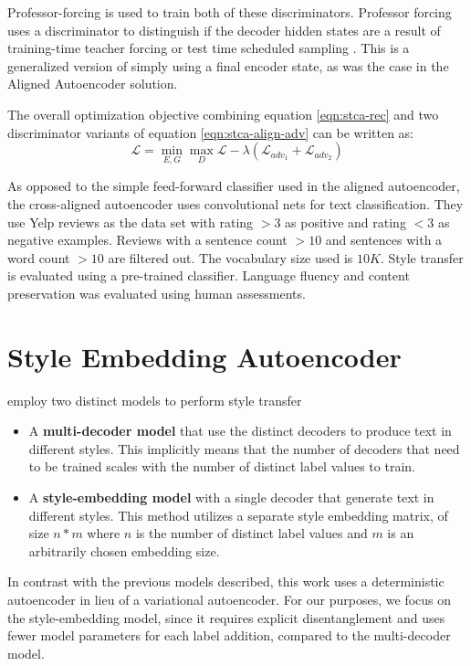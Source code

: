 Professor-forcing is used to train both of these discriminators. Professor forcing uses a discriminator to distinguish if the decoder hidden states are a result of training-time teacher forcing or test time scheduled sampling \citep{lamb2016professor}. This is a generalized version of simply using a final encoder state, as was the case in the Aligned Autoencoder solution.

The overall optimization objective combining equation \ref{eqn:stca-rec} and two discriminator variants of equation \ref{eqn:stca-align-adv} can be written as:
\begin{equation}
	\mathcal{L} = \operatorname*{min}_{E,G} \operatorname*{max}_{D} \mathcal{L} - \lambda (\mathcal{L}_{adv_1} + \mathcal{L}_{adv_2})
\end{equation}

As opposed to the simple feed-forward classifier used in the aligned autoencoder, the cross-aligned autoencoder uses convolutional nets for text classification. They use Yelp reviews as the data set with rating $>3$ as positive and rating $<3$ as negative examples. Reviews with a sentence count $>10$ and sentences with a word count $>10$ are filtered out. The vocabulary size used is $10K$. Style transfer is evaluated using a pre-trained classifier. Language fluency and content preservation was evaluated using human assessments.

\section{Style Embedding Autoencoder}

\cite{fu2017style} employ two distinct models to perform style transfer
\begin{itemize}
	\item A \textbf{multi-decoder model} that use the distinct decoders to produce text in different styles. This implicitly means that the number of decoders that need to be trained scales with the number of distinct label values to train.
	\item A \textbf{style-embedding model} with a single decoder that generate text in different styles. This method utilizes a separate style embedding matrix, of size $n * m$ where $n$ is the number of distinct label values and $m$ is an arbitrarily chosen embedding size.
\end{itemize}

In contrast with the previous models described, this work uses a deterministic autoencoder in lieu of a variational autoencoder. For our purposes, we focus on the style-embedding model, since it requires explicit disentanglement and uses fewer model parameters for each label addition, compared to the multi-decoder model.

